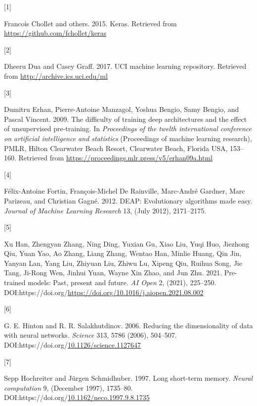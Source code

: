 \documentclass[
  11pt,
]{article}
\newlength{\cslhangindent}
\newlength{\csllabelwidth}
\newlength{\cslentryspacingunit} %
\newenvironment{CSLReferences}[2] %
 {%
  \setlength{\parindent}{0pt}
  \ifodd #1
  \let\oldpar\par
  \def\par{\hangindent=\cslhangindent\oldpar}
  \fi
  \setlength{\parskip}{#2\cslentryspacingunit}
 }%
 {}
\newcommand{\CSLLeftMargin}[1]{\parbox[t]{\csllabelwidth}{#1}}
\newcommand{\CSLRightInline}[1]{\parbox[t]{\linewidth - \csllabelwidth}{#1}\break}
\begin{document}
\hypertarget{refs}{}
\begin{CSLReferences}{0}{0}
\leavevmode{}%
\CSLLeftMargin{{[}1{]} }%
\CSLRightInline{Francois Chollet and others. 2015. Keras. Retrieved from \url{https://github.com/fchollet/keras}}

\leavevmode{}%
\CSLLeftMargin{{[}2{]} }%
\CSLRightInline{Dheeru Dua and Casey Graff. 2017. {UCI} machine learning repository. Retrieved from \url{http://archive.ics.uci.edu/ml}}

\leavevmode{}%
\CSLLeftMargin{{[}3{]} }%
\CSLRightInline{Dumitru Erhan, Pierre-Antoine Manzagol, Yoshua Bengio, Samy Bengio, and Pascal Vincent. 2009. The difficulty of training deep architectures and the effect of unsupervised pre-training. In \emph{Proceedings of the twelth international conference on artificial intelligence and statistics} (Proceedings of machine learning research), PMLR, Hilton Clearwater Beach Resort, Clearwater Beach, Florida USA, 153--160. Retrieved from \url{https://proceedings.mlr.press/v5/erhan09a.html}}

\leavevmode{}%
\CSLLeftMargin{{[}4{]} }%
\CSLRightInline{Félix-Antoine Fortin, François-Michel De Rainville, Marc-André Gardner, Marc Parizeau, and Christian Gagné. 2012. {DEAP}: Evolutionary algorithms made easy. \emph{Journal of Machine Learning Research} 13, (July 2012), 2171--2175.}

\leavevmode{}%
\CSLLeftMargin{{[}5{]} }%
\CSLRightInline{Xu Han, Zhengyan Zhang, Ning Ding, Yuxian Gu, Xiao Liu, Yuqi Huo, Jiezhong Qiu, Yuan Yao, Ao Zhang, Liang Zhang, Wentao Han, Minlie Huang, Qin Jin, Yanyan Lan, Yang Liu, Zhiyuan Liu, Zhiwu Lu, Xipeng Qiu, Ruihua Song, Jie Tang, Ji-Rong Wen, Jinhui Yuan, Wayne Xin Zhao, and Jun Zhu. 2021. Pre-trained models: Past, present and future. \emph{AI Open} 2, (2021), 225--250. DOI:https://doi.org/\url{https://doi.org/10.1016/j.aiopen.2021.08.002}}

\leavevmode{}%
\CSLLeftMargin{{[}6{]} }%
\CSLRightInline{G. E. Hinton and R. R. Salakhutdinov. 2006. Reducing the dimensionality of data with neural networks. \emph{Science} 313, 5786 (2006), 504--507. DOI:https://doi.org/\href{https://doi.org/10.1126/science.1127647}{10.1126/science.1127647}}

\leavevmode{}%
\CSLLeftMargin{{[}7{]} }%
\CSLRightInline{Sepp Hochreiter and Jürgen Schmidhuber. 1997. Long short-term memory. \emph{Neural computation} 9, (December 1997), 1735--80. DOI:https://doi.org/\href{https://doi.org/10.1162/neco.1997.9.8.1735}{10.1162/neco.1997.9.8.1735}}


\end{CSLReferences}
\end{document}
